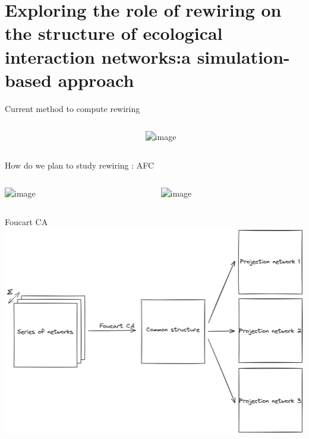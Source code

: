 \documentclass{beamer}
\begin{document}
\section{Exploring the role of rewiring on the structure of ecological interaction networks:\newline a simulation-based approach}


\begin{frame}{Current method to compute rewiring}
\protect\hypertarget{current-method-to-compute-rewiring}{}
\begin{columns}
  \begin{column}{.5\linewidth}
    \vspace{-1em}
  \end{column}
  \begin{column}{.5\linewidth}
    \includegraphics<1->[width=\linewidth]{figures_slides/beta_div.png}%
  \end{column}
\end{columns}
\end{frame}

\begin{frame}{How do we plan to study rewiring : AFC}
\protect\hypertarget{How-do-we-plan-to-study-rewiring-:-AFC}{}
\begin{columns}
  \begin{column}{.5\linewidth}
    \includegraphics<1->[width=\linewidth]{figures_slides/network.png}%
  \end{column}
  \begin{column}{.5\linewidth}
    \includegraphics<2->[width=\linewidth]{figures_slides/AFC}%
  \end{column}
\end{columns}
\end{frame}
\begin{frame}{Foucart CA}
\protect\hypertarget{foucart-ca}{}
\includegraphics[width=\linewidth]{figures_slides/foucart.png}%
\end{frame}
\end{document}
